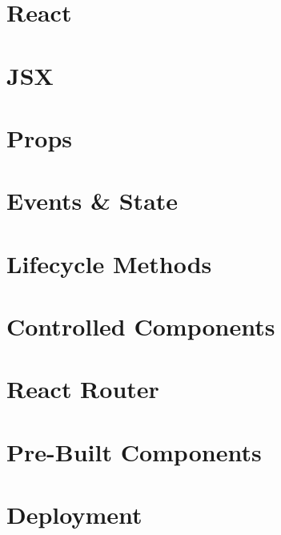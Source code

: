 \documentclass[b5paper,openany]{book}
\begin{document}
\tp


\tableofcontents



\chapter{React}


\chapter{JSX}


\chapter{Props}


\chapter{Events \& State}


\chapter{Lifecycle Methods}


\chapter{Controlled Components}


\chapter{React Router}


\chapter{Pre-Built Components}


\chapter{Deployment}






\end{document}
